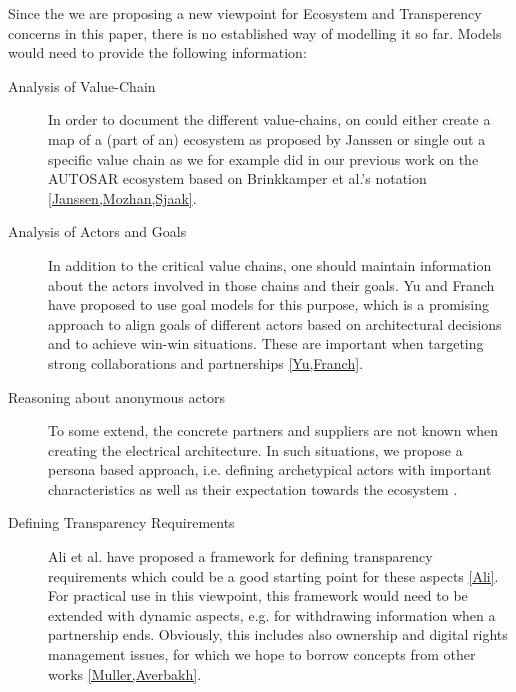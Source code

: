 Since the we are proposing a new viewpoint for Ecosystem and Transperency concerns in this paper, there is no established way of modelling it so far. 
Models would need to provide the following information:
\begin{description}
\item[Analysis of Value-Chain] In order to document the different value-chains, on could either create a map of a (part of an) ecosystem as proposed by Janssen or single out a specific value chain as we for example did in our previous work on the AUTOSAR ecosystem based on Brinkkamper et al.'s notation \ref{Janssen,Mozhan,Sjaak}.
\item[Analysis of Actors and Goals] In addition to the critical value chains, one should maintain information about the actors involved in those chains and their goals.
Yu and Franch have proposed to use goal models for this purpose, which is a promising approach to align goals of different actors based on architectural decisions and to achieve win-win situations. These are important when targeting strong collaborations and partnerships \ref{Yu,Franch}.
\item[Reasoning about anonymous actors] To some extend, the concrete partners and suppliers are not known when creating the electrical architecture. 
In such situations, we propose a persona based approach, i.e. defining archetypical actors with important characteristics as well as their expectation towards the ecosystem \cite{EAM}.
\item[Defining Transparency Requirements] Ali et al. have proposed a framework for defining transparency requirements which could be a good starting point for these aspects \ref{Ali}. For practical use in this viewpoint, this framework would need to be extended with dynamic aspects, e.g. for withdrawing information when a partnership ends. 
Obviously, this includes also ownership and digital rights management issues, for which we hope to borrow concepts from other works \ref{Muller,Averbakh}.
\end{description}


